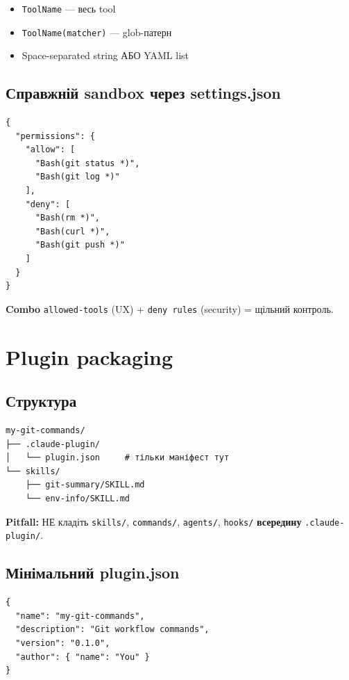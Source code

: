 \documentclass[11pt,a4paper]{article}
\begin{document}
\begin{itemize}
\item \texttt{ToolName} --- весь tool
\item \texttt{ToolName(matcher)} --- glob-патерн
\item Space-separated string АБО YAML list
\end{itemize}

\subsection{Справжній sandbox через settings.json}

\begin{lstlisting}
{
  "permissions": {
    "allow": [
      "Bash(git status *)",
      "Bash(git log *)"
    ],
    "deny": [
      "Bash(rm *)",
      "Bash(curl *)",
      "Bash(git push *)"
    ]
  }
}
\end{lstlisting}

\textbf{Combo} \texttt{allowed-tools} (UX) + \texttt{deny rules} (security) = щільний контроль.

\section{Plugin packaging}

\subsection{Структура}

\begin{lstlisting}
my-git-commands/
├── .claude-plugin/
│   └── plugin.json     # тільки маніфест тут
└── skills/
    ├── git-summary/SKILL.md
    └── env-info/SKILL.md
\end{lstlisting}

\textbf{Pitfall:} НЕ кладіть \texttt{skills/}, \texttt{commands/}, \texttt{agents/}, \texttt{hooks/} \textbf{всередину} \texttt{.claude-plugin/}.

\subsection{Мінімальний plugin.json}

\begin{lstlisting}
{
  "name": "my-git-commands",
  "description": "Git workflow commands",
  "version": "0.1.0",
  "author": { "name": "You" }
}
\end{lstlisting}
\end{document}
